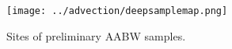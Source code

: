 \begin{figure}
  \centering
  \texttt{[image: ../advection/deepsamplemap.png]}
  \caption[Map showing sites of preliminary \ac{AABW} samples]{Sites of preliminary \ac{AABW} samples.}
  \label{fig:deepsamplemap}
\end{figure}
